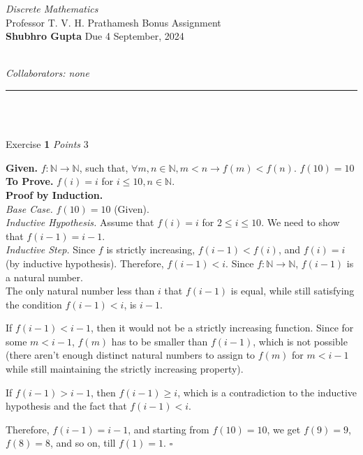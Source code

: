 \documentclass[11pt]{article}
\newcommand{\problem
}[2]{
\begin{mdframed}
    Exercise \textbf{#1} \hfill \emph{Points }#2
\end{mdframed}
}
\newcommand{\heading}[5]{
\begin{large}
\noindent\emph{#1}\smallskip ~\\
Professor #3 \hfill Bonus #2 \smallskip ~\\
\textbf{Shubhro Gupta} \hfill Due #4 ~\\
\end{large} \medskip ~\\
{\emph{Collaborators: #5}}~\\
\hrule
\vspace{50pt}
~\\
}
\begin{document}
\heading{Discrete Mathematics}{Assignment}{T. V. H. Prathamesh}{4 September, 2024}{none}
\\
\problem{1}{3}
\textbf{Given. } $f: \mathbb{N} \to \mathbb{N}$, such that, $\forall m, n \in \mathbb{N}, m < n \rightarrow f(m) < f(n)$.
$f(10) = 10$ \\
\noindent \textbf{To Prove. } $f(i) = i$ for $i\leq 10, n \in \mathbb{N}$.\\
\noindent \textbf{Proof by Induction. }\\
\emph{Base Case.}  $f(10) = 10$ (Given).\\
\emph{Inductive Hypothesis.}  Assume that $f(i) = i$ for $2 \leq i \leq 10$. We need to show that $f(i-1) = i-1$.\\
\emph{Inductive Step.}   Since $f$ is strictly increasing, $f(i-1) < f(i)$, and $f(i) = i$ (by inductive hypothesis). Therefore, $f(i-1) < i$. Since $f: \mathbb{N} \to \mathbb{N}$, $f(i-1)$ is a natural number. \medskip \\
The only natural number less than $i$ that $f(i-1)$ is equal, while still satisfying the condition $f(i-1) < i$, is $i-1$.
\begin{arrowlist}
	\item If $f(i-1) < i-1$, then it would not be a strictly increasing function. Since for some $m < i-1$, $f(m)$ has to be smaller than $f(i-1)$, which is not possible (there aren't enough distinct natural numbers to assign to $f(m)$ for $m<i−1$ while still maintaining the strictly increasing property).
	\item If $f(i-1) > i - 1$, then $f(i-1) \geq i$, which is a contradiction to the inductive hypothesis and the fact that $f(i-1) < i$.
\end{arrowlist}
Therefore, $f(i-1) = i-1$, and starting from $f(10) = 10$, we get $f(9) = 9$, $f(8) = 8$, and so on, till $f(1) = 1$. \hfill $\square$\\
\end{document}
